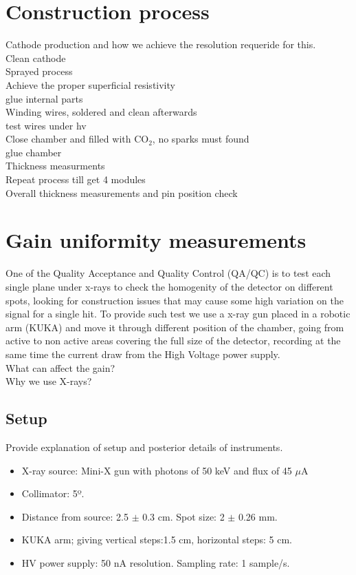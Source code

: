 \section{Construction process}
Cathode production and how we achieve the resolution requeride for this.\\
Clean cathode\\
Sprayed process\\
Achieve the proper superficial resistivity\\
glue internal parts\\
Winding wires, soldered and clean afterwards\\
test wires under hv\\
Close chamber and filled with CO$_2$, no sparks must found\\
glue chamber\\
Thickness measurments\\
Repeat process till get 4 modules\\
Overall thickness measurements and pin position check\\


\section{Gain uniformity measurements}

One of the Quality Acceptance and Quality Control (QA/QC) is to test each single plane under x-rays to check the homogenity of the detector on different spots, looking for construction issues that may cause some high variation on the signal for a single hit. To provide such test we use a x-ray gun placed in a robotic arm (KUKA) and move it through different position of the chamber, going from active to non active areas covering the full size of the detector, recording at the same time the current draw from the High Voltage power supply.\\
What can affect the gain?\\
Why we use X-rays?\\

\subsection{Setup}
Provide explanation of setup and posterior details of instruments.\\

\begin{itemize}
\item X-ray source: Mini-X gun with photons of  50 keV and flux of  45 $\mu$A
\item Collimator: 5º.
\item Distance from source: 2.5 $\pm$ 0.3 cm. Spot size: 2 $\pm$ 0.26 mm.
\item KUKA arm; giving vertical steps:1.5 cm, horizontal steps: 5 cm.
\item HV power supply: 50 nA resolution. Sampling rate: 1 sample/s.
\end{itemize}



